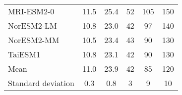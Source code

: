 \begin{table}
\begin{tabular}{lccccc}
  MRI-ESM2-0         & 11.5                               & 25.4                               & 52                                 & 105                                & 150                                \\
  NorESM2-LM         & 10.8                               & 23.0                               & 42                                 & 97                                 & 140                                \\
  NorESM2-MM         & 10.5                               & 23.4                               & 43                                 & 90                                 & 130                                \\
  TaiESM1            & 10.8                               & 23.1                               & 42                                 & 90                                 & 130                                \\
  \hline
  Mean               & 11.0                               & 23.9                               & 42                                 & 85                                 & 120                                \\
  Standard deviation & 0.3                                & 0.8                                & 3                                  & 9                                  & 10                                 \\
\end{tabular}
\end{table}
